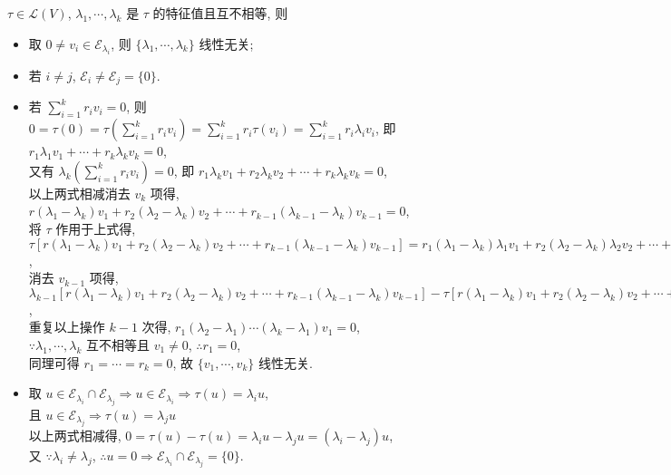 \documentclass{note}
\begin{document}
\begin{thm}[(课本定理 8.4)]
    $\tau\in\mathcal{L}(V)$, $\lambda_1,\cdots,\lambda_k$ 是 $\tau$ 的特征值且互不相等, 则
    \begin{itemize}
        \item[(1)] 取 $0\neq v_i\in\mathcal{E}_{\lambda_i}$, 则 $\{\lambda_1,\cdots,\lambda_k\}$ 线性无关;
        \item[(2)] 若 $i\neq j$, $\mathcal{E}_i\neq\mathcal{E}_j=\{0\}$.
    \end{itemize}
\end{thm}
\begin{pf}
    \begin{itemize}
        \item[(1)] 若 $\sum_{i=1}^kr_iv_i=0$, 则 $0=\tau(0)=\tau\left(\sum_{i=1}^kr_iv_i\right)=\sum_{i=1}^kr_i\tau(v_i)=\sum_{i=1}^kr_i\lambda_iv_i$, 即 $r_1\lambda_1v_1+\cdots+r_k\lambda_kv_k=0$,\\
        又有 $\lambda_k\left(\sum_{i=1}^kr_iv_i\right)=0$, 即 $r_1\lambda_kv_1+r_2\lambda_kv_2+\cdots+r_k\lambda_kv_k=0$,\\
        以上两式相减消去 $v_k$ 项得, $r(\lambda_1-\lambda_k)v_1+r_2(\lambda_2-\lambda_k)v_2+\cdots+r_{k-1}(\lambda_{k-1}-\lambda_k)v_{k-1}=0$,\\
        将 $\tau$ 作用于上式得, $\tau\left[r(\lambda_1-\lambda_k)v_1+r_2(\lambda_2-\lambda_k)v_2+\cdots+r_{k-1}(\lambda_{k-1}-\lambda_k)v_{k-1}\right]=r_1(\lambda_1-\lambda_k)\lambda_1v_1+r_2(\lambda_2-\lambda_k)\lambda_2v_2+\cdots+r_{k-1}(\lambda_{k-1}-\lambda_k)\lambda_{k-1}v_{k-1}=\tau(0)=0$,\\
        消去 $v_{k-1}$ 项得, $\lambda_{k-1}\left[r(\lambda_1-\lambda_k)v_1+r_2(\lambda_2-\lambda_k)v_2+\cdots+r_{k-1}(\lambda_{k-1}-\lambda_k)v_{k-1}\right]-\tau\left[r(\lambda_1-\lambda_k)v_1+r_2(\lambda_2-\lambda_k)v_2+\cdots+r_{k-1}(\lambda_{k-1}-\lambda_k)v_{k-1}\right]=r_1(\lambda_k-\lambda_1)(\lambda_{k-1}-\lambda_1)v_1+r_2(\lambda_k-\lambda_2)(\lambda_{k-1}-\lambda_2)v_2+\cdots+r_{k-1}(\lambda_k-\lambda_{k-2})(\lambda_{k-1}-\lambda_{k-2})v_{k-2}=0$,\\
        重复以上操作 $k-1$ 次得, $r_1(\lambda_2-\lambda_1)\cdots(\lambda_k-\lambda_1)v_1=0$,\\
        $\because\lambda_1,\cdots,\lambda_k$ 互不相等且 $v_1\neq 0$, $\therefore r_1=0$,\\
        同理可得 $r_1=\cdots=r_k=0$, 故 $\{v_1,\cdots,v_k\}$ 线性无关.
        \item[(2)] 取 $u\in\mathcal{E}_{\lambda_i}\cap\mathcal{E}_{\lambda_j}\Longrightarrow u\in\mathcal{E}_{\lambda_i}\Longrightarrow\tau(u)=\lambda_iu$,\\
        且 $u\in\mathcal{E}_{\lambda_j}\Longrightarrow\tau(u)=\lambda_ju$\\
        以上两式相减得, $0=\tau(u)-\tau(u)=\lambda_iu-\lambda_ju=(\lambda_i-\lambda_j)u$,\\
        又 $\because\lambda_i\neq\lambda_j$, $\therefore u=0\Longrightarrow\mathcal{E}_{\lambda_i}\cap\mathcal{E}_{\lambda_j}=\{0\}$.
    \end{itemize}
\end{pf}
\end{document}
